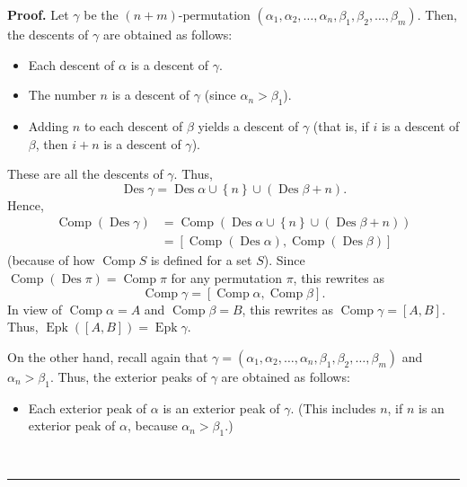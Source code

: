 \documentclass[numbers=enddot,12pt,final,onecolumn,notitlepage]{scrartcl}%
\theoremstyle{definition}
\newenvironment{proof}[1][Proof]{\noindent\textbf{#1.} }{\ \rule{0.5em}{0.5em}}
\newenvironment{verlong}{}{}
\begin{document}
\begin{verlong}
\begin{proof}
Let $\gamma$ be the $\left(  n+m\right)  $-permutation $\left(  \alpha
_{1},\alpha_{2},\ldots,\alpha_{n},\beta_{1},\beta_{2},\ldots,\beta_{m}\right)
$. Then, the descents of $\gamma$ are obtained as follows:

\begin{itemize}
\item Each descent of $\alpha$ is a descent of $\gamma$.

\item The number $n$ is a descent of $\gamma$ (since $\alpha_{n}>\beta_{1}$).

\item Adding $n$ to each descent of $\beta$ yields a descent of $\gamma$ (that
is, if $i$ is a descent of $\beta$, then $i+n$ is a descent of $\gamma$).
\end{itemize}

These are all the descents of $\gamma$. Thus,%
\[
\operatorname*{Des}\gamma=\operatorname*{Des}\alpha\cup\left\{  n\right\}
\cup\left(  \operatorname*{Des}\beta+n\right)  .
\]
Hence,%
\begin{align*}
\operatorname*{Comp}\left(  \operatorname*{Des}\gamma\right)   &
=\operatorname*{Comp}\left(  \operatorname*{Des}\alpha\cup\left\{  n\right\}
\cup\left(  \operatorname*{Des}\beta+n\right)  \right) \\
&  =\left[  \operatorname*{Comp}\left(  \operatorname*{Des}\alpha\right)
,\operatorname*{Comp}\left(  \operatorname*{Des}\beta\right)  \right]
\end{align*}
(because of how $\operatorname*{Comp}S$ is defined for a set $S$). Since
$\operatorname*{Comp}\left(  \operatorname*{Des}\pi\right)
=\operatorname*{Comp}\pi$ for any permutation $\pi$, this rewrites as%
\[
\operatorname*{Comp}\gamma=\left[  \operatorname*{Comp}\alpha
,\operatorname*{Comp}\beta\right]  .
\]
In view of $\operatorname*{Comp}\alpha=A$ and $\operatorname*{Comp}\beta=B$,
this rewrites as $\operatorname*{Comp}\gamma=\left[  A,B\right]  $. Thus,
$\operatorname*{Epk}\left(  \left[  A,B\right]  \right)  =\operatorname*{Epk}%
\gamma$.

On the other hand, recall again that $\gamma=\left(  \alpha_{1},\alpha
_{2},\ldots,\alpha_{n},\beta_{1},\beta_{2},\ldots,\beta_{m}\right)  $ and
$\alpha_{n}>\beta_{1}$. Thus, the exterior peaks of $\gamma$ are obtained as follows:

\begin{itemize}
\item Each exterior peak of $\alpha$ is an exterior peak of $\gamma$. (This
includes $n$, if $n$ is an exterior peak of $\alpha$, because $\alpha
_{n}>\beta_{1}$.)


\end{itemize}
\end{proof}
\end{verlong}
\end{document}
